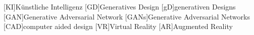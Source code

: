\begin{acronym}
  [KI]{Künstliche Intelligenz}
  [GD]{Generatives Design }
  [gD]{generativen Designs}
  [GAN]{Generative Adversarial Network}
  [GANs]{Generative Adversarial Networks}
  [CAD]{computer aided design}
  [VR]{Virtual Reality}
  [AR]{Augmented Reality}

\end{acronym}